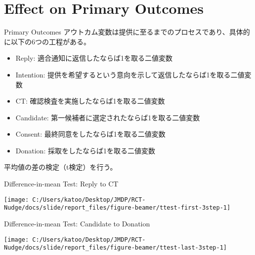 \documentclass[
      aspectratio=169,
        12pt,
    ]{beamer}
\providecommand{\tightlist}{%
  \setlength{\itemsep}{0pt}\setlength{\parskip}{0pt}}
\begin{document}
\hypertarget{effect-on-primary-outcomes}{%
\section{Effect on Primary Outcomes}\label{effect-on-primary-outcomes}}

\begin{frame}{Primary Outcomes}
\protect\hypertarget{primary-outcomes}{}
アウトカム変数は提供に至るまでのプロセスであり、具体的に以下の6つの工程がある。

\begin{itemize}
\tightlist
\item
  Reply: 適合通知に返信したならば1を取る二値変数
\item
  Intention: 提供を希望するという意向を示して返信したならば1を取る二値変数
\item
  CT: 確認検査を実施したならば1を取る二値変数
\item
  Candidate: 第一候補者に選定されたならば1を取る二値変数
\item
  Consent: 最終同意をしたならば1を取る二値変数
\item
  Donation: 採取をしたならば1を取る二値変数
\end{itemize}

平均値の差の検定（t検定）を行う。
\end{frame}

\begin{frame}{Difference-in-mean Test: Reply to CT}
\protect\hypertarget{difference-in-mean-test-reply-to-ct}{}
\begin{center}\texttt{[image: C:/Users/katoo/Desktop/JMDP/RCT-Nudge/docs/slide/report\_files/figure-beamer/ttest-first-3step-1]} \end{center}
\end{frame}

\begin{frame}{Difference-in-mean Test: Candidate to Donation}
\protect\hypertarget{difference-in-mean-test-candidate-to-donation}{}
\begin{center}\texttt{[image: C:/Users/katoo/Desktop/JMDP/RCT-Nudge/docs/slide/report\_files/figure-beamer/ttest-last-3step-1]} \end{center}
\end{frame}
\end{document}
